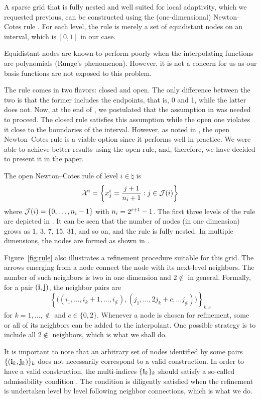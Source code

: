A sparse grid that is fully nested and well suited for local adaptivity, which
we requested previous, can be constructed using the (one-dimensional)
Newton--Cotes rule \cite{klimke2006, ma2009}. For each level, the rule is merely
a set of equidistant nodes on an interval, which is $[0, 1]$ in our case.

\begin{remark}
Equidistant nodes are known to perform poorly when the interpolating functions
are polynomials (Runge's phenomenon). However, it is not a concern for us as our
basis functions are not exposed to this problem.
\end{remark}

The rule comes in two flavors: closed and open. The only difference between the
two is that the former includes the endpoints, that is, 0 and 1, while the
latter does not. Now, at the end of , we postulated that
the assumption in  was needed to proceed. The closed rule
satisfies this assumption while the open one violates it close to the boundaries
of the interval. However, as noted in \cite{klimke2006}, the open Newton--Cotes
rule is a viable option since it performs well in practice. We were able to
achieve better results using the open rule, and, therefore, we have decided to
present it in the paper.


The open Newton--Cotes rule of level $i \in \natural$ is
\[
  \mathcal{X}^i = \left\{ x^i_j = \frac{j + 1}{n_i + 1}: j \in \mathcal{J}(i) \right\}
\]
where $\mathcal{J}(i) = \left\{ 0, \dots, n_i - 1 \right\}$ with $n_i = 2^{i + 1} -
1$. The first three levels of the rule are depicted in . It can be
seen that the number of nodes (in one dimension) grows as 1, 3, 7, 15, 31, and
so on, and the rule is fully nested. In multiple dimensions, the nodes are
formed as shown in .

Figure~\ref{fig:rule} also illustrates a refinement procedure suitable for this
grid. The arrows emerging from a node connect the node with its next-level
neighbors. The number of such neighbors is two in one dimension and $2 \nin$ in
general. Formally, for a pair $(\mathbf{i}, \mathbf{j})$, the neighbor pairs are
\[
  \left\{ \Big( (i_1, \dots, i_k + 1, \dots, i_\nin), (j_1, \dots, 2 j_k + c, \dots j_\nin) \Big) \right\}_{k, c}
\]
for $k = 1, \dots, \nin$ and $c \in \{ 0, 2 \}$. Whenever a node is chosen for
refinement, some or all of its neighbors can be added to the interpolant. One
possible strategy is to include all $2 \nin$ neighbors, which is what we shall
do.

\begin{remark}
It is important to note that an arbitrary set of nodes identified by some pairs
$\{ (\mathbf{i}_k, \mathbf{j}_k) \}_k$ does not necessarily correspond to a valid
construction. In order to have a valid construction, the multi-indices $\{ \mathbf{i}_k
\}_k$ should satisfy a so-called admissibility condition \cite{klimke2006}. The
condition is diligently satisfied when the refinement is undertaken level by
level following neighbor connections, which is what we do.
\end{remark}
